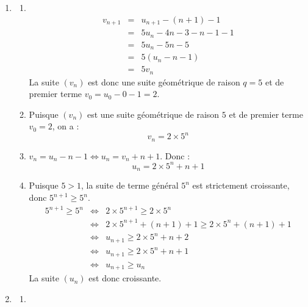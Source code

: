 \begin{enumerate}
\begin{enumerate}
\emph{Conclusion} : la proposition $P_n$ est vérifiée au rang $n = 0$ et est héréditaire, donc, d'après le principe de récurrence, elle est vraie pour tout entier naturel $n$ : $u_n \geqslant n + 1$.
		\item On a : $\lim\limits_{n \to +\infty}(n+1) = +\infty$. Puisque $u_n \geqslant n+1$, par comparaison, on a :
		\[\boxed{\lim_{n \to +\infty}u_n = +\infty}\]
	\end{enumerate}
	\item
    \begin{enumerate}
		\item\
		\begin{eqnarray*}
			v_{n+1} &=& u_{n+1}-(n+1) - 1\\
			&=& 5u_n - 4n - 3 - n - 1 - 1\\
			&=& 5u_n - 5n - 5\\
			&=& 5\left(u_n - n - 1\right)\\
			&=& 5v_n
		\end{eqnarray*}
La suite $\left(v_n\right)$ est donc une suite géométrique de raison $q=5$ et de premier terme $v_0 = u_0 - 0 - 1 = 2$.
		\item Puisque $\left(v_n\right)$ est une suite géométrique de raison $5$ et de premier terme $v_0=2$, on a :
		\[\boxed{v_n = 2 \times 5^n}\]
		\item $v_n = u_n - n - 1 \iff u_n = v_n + n + 1$. Donc :
		\[\boxed{u_n = 2 \times 5^n + n + 1}\]
		\item  Puisque $5 > 1$, la suite de terme général $5^n$ est strictement croissante, donc $5^{n+1} \geqslant 5^n$.
		\begin{eqnarray*}
			5^{n+1} \geqslant 5^n &\iff& 2 \times 5^{n+1} \geqslant 2 \times 5^n\\
			&\iff& 2\times 5^{n+1} + (n+1) + 1 \geqslant 2 \times 5^n + (n + 1) + 1\\
			&\iff& u_{n+1} \geqslant 2 \times 5^n + n + 2\\
			&\iff& u_{n+1} \geqslant 2 \times 5^n + n + 1\\
			&\iff& u_{n+1} \geqslant u_n
		\end{eqnarray*}
		La suite $\left(u_n\right)$ est donc croissante.
	\end{enumerate}
	\item
	\begin{enumerate}
		\item\
		

\end{enumerate}
\end{enumerate}
